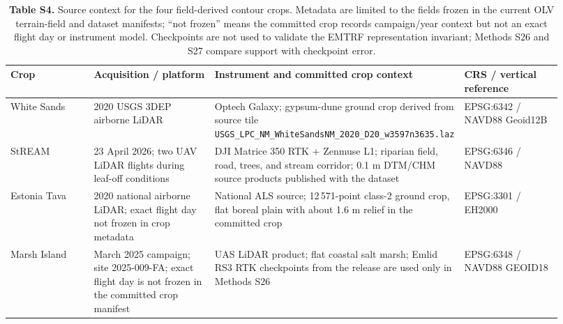 \documentclass[11pt]{article}
\begin{document}
\begin{table}[!htbp]
\centering
\caption*{\textbf{Table S4.} Source context for the four field-derived contour crops. Metadata are limited to the fields frozen in the current OLV terrain-field and dataset manifests; ``not frozen'' means the committed crop records campaign/year context but not an exact flight day or instrument model. Checkpoints are not used to validate the EMTRF representation invariant; Methods S26 and S27 compare support with checkpoint error.}
\vspace{2mm}
\small
\scriptsize
\setlength{\tabcolsep}{3.0pt}
\begin{tabularx}{\linewidth}{@{}p{0.17\linewidth}p{0.25\linewidth}p{0.30\linewidth}p{0.20\linewidth}@{}}
\toprule
Crop & Acquisition / platform & Instrument and committed crop context & CRS / vertical reference \\
\midrule
White Sands & 2020 USGS 3DEP airborne LiDAR & Optech Galaxy; gypsum-dune ground crop derived from source tile \nolinkurl{USGS_LPC_NM_WhiteSandsNM_2020_D20_w3597n3635.laz} & EPSG:6342 / NAVD88 Geoid12B \\
StREAM & 23 April 2026; two UAV LiDAR flights during leaf-off conditions & DJI Matrice 350 RTK + Zenmuse L1; riparian field, road, trees, and stream corridor; 0.1 m DTM/CHM source products published with the dataset & EPSG:6346 / NAVD88 \\
Estonia Tava & 2020 national airborne LiDAR; exact flight day not frozen in crop metadata & National ALS source; 12\,571-point class-2 ground crop, flat boreal plain with about 1.6 m relief in the committed crop & EPSG:3301 / EH2000 \\
Marsh Island & March 2025 campaign; site 2025-009-FA; exact flight day is not frozen in the committed crop manifest & UAS LiDAR product; flat coastal salt marsh; Emlid RS3 RTK checkpoints from the release are used only in Methods S26 & EPSG:6348 / NAVD88 GEOID18 \\
\bottomrule
\end{tabularx}
\end{table}
\vspace{6mm}
\end{document}
